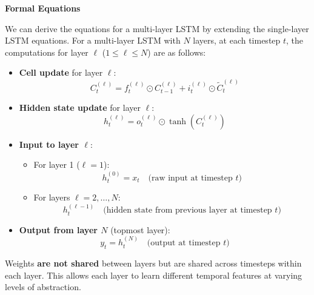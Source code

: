 \begin{flushleft}
    \textcolor{Green3}{ \textbf{Formal Equations}}
\end{flushleft}
We can derive the equations for a multi-layer LSTM by extending the single-layer LSTM equations. For a multi-layer LSTM with $N$ layers, at each timestep $t$, the computations for layer $\ell$ ($1 \leq \ell \leq N$) are as follows:
\begin{itemize}
    \item \textbf{Cell update} for layer $\ell$:
    \begin{equation*}
        C_{t}^{(\ell)} = f_t^{(\ell)} \odot C_{t-1}^{(\ell)} + i_t^{(\ell)} \odot \tilde{C}_t^{(\ell)}
    \end{equation*}
    \item \textbf{Hidden state update} for layer $\ell$:
    \begin{equation*}
        h_{t}^{(\ell)} = o_t^{(\ell)} \odot \tanh(C_{t}^{(\ell)})
    \end{equation*}
    \item \textbf{Input to layer $\ell$}:
    \begin{itemize}
        \item For layer 1 ($\ell = 1$):
        \begin{equation*}
            h_{t}^{(0)} = x_t \quad \text{(raw input at timestep } t\text{)}
        \end{equation*}
        \item For layers $\ell = 2, \ldots, N$:
        \begin{equation*}
            h_{t}^{(\ell-1)} \quad \text{(hidden state from previous layer at timestep } t\text{)}
        \end{equation*}
    \end{itemize}
    \item \textbf{Output from layer $N$} (topmost layer):
    \begin{equation*}
        y_t = h_{t}^{(N)} \quad \text{(output at timestep } t\text{)}
    \end{equation*}
\end{itemize}
Weights \textbf{are not shared} between layers but are shared across timesteps within each layer. This allows each layer to learn different temporal features at varying levels of abstraction.

